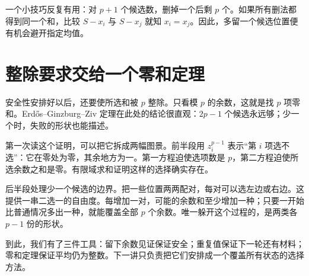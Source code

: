 一个小技巧反复有用：对 $p+1$ 个候选数，删掉一个后剩 $p$ 个。如果所有删法都得到同一个和，比较 $S-x_i$ 与 $S-x_j$ 就知 $x_i=x_j$。因此，多留一个候选位置便有机会避开指定均值。

\section{整除要求交给一个零和定理}
安全性安排好以后，还要使所选和被 $p$ 整除。只看模 $p$ 的余数，这就是找 $p$ 项零和。Erdős--Ginzburg--Ziv 定理在此处的结论很直观：$2p-1$ 个候选永远够；少一个时，失败的形状也能描述。

第一次读这个证明，可以把它拆成两幅图景。前半段用 $z_i^{p-1}$ 表示“第 $i$ 项选不选”：它在零处为零，其余地方为一。第一方程迫使选项数是 $p$，第二方程迫使所选余数之和是零。有限域求和证明这样的选择确实存在。

后半段处理少一个候选的边界。把一些位置两两配对，每对可以选左边或右边。这提供一串二选一的自由度。每增加一对，可能的余数和至少增加一种；只要一开始比普通情况多出一种，就能覆盖全部 $p$ 个余数。唯一躲开这个过程的，是两类各 $p-1$ 份的形状。

到此，我们有了三件工具：留下余数见证保证安全；重复值保证下一轮还有材料；零和定理保证平均仍为整数。下一讲只负责把它们安排成一个覆盖所有状态的选择方法。
